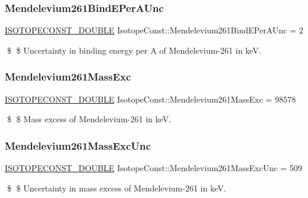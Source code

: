 \subsubsection{\texorpdfstring{Mendelevium261\+Bind\+E\+Per\+A\+Unc}{Mendelevium261BindEPerAUnc}}
{\footnotesize\ttfamily \mbox{\hyperlink{group___isotope_const-_macros_ga8f45a7272ce02c0b4c65c44636ed719a}{I\+S\+O\+T\+O\+P\+E\+C\+O\+N\+S\+T\+\_\+\+D\+O\+U\+B\+LE}} Isotope\+Const\+::\+Mendelevium261\+Bind\+E\+Per\+A\+Unc = 2}

\$ \$ Uncertainty in binding energy per A of Mendelevium-\/261 in keV. \mbox{\label{group___isotope_const-_mendelevium-_md261_ga8e60edaa6be277cbade5ac67ab75b1ed}} 
\subsubsection{\texorpdfstring{Mendelevium261\+Mass\+Exc}{Mendelevium261MassExc}}
{\footnotesize\ttfamily \mbox{\hyperlink{group___isotope_const-_macros_ga8f45a7272ce02c0b4c65c44636ed719a}{I\+S\+O\+T\+O\+P\+E\+C\+O\+N\+S\+T\+\_\+\+D\+O\+U\+B\+LE}} Isotope\+Const\+::\+Mendelevium261\+Mass\+Exc = 98578}

\$ \$ Mass excess of Mendelevium-\/261 in keV. \mbox{\label{group___isotope_const-_mendelevium-_md261_ga5534ceccb4458aea1d197ea616193dbe}} 
\subsubsection{\texorpdfstring{Mendelevium261\+Mass\+Exc\+Unc}{Mendelevium261MassExcUnc}}
{\footnotesize\ttfamily \mbox{\hyperlink{group___isotope_const-_macros_ga8f45a7272ce02c0b4c65c44636ed719a}{I\+S\+O\+T\+O\+P\+E\+C\+O\+N\+S\+T\+\_\+\+D\+O\+U\+B\+LE}} Isotope\+Const\+::\+Mendelevium261\+Mass\+Exc\+Unc = 509}

\$ \$ Uncertainty in mass excess of Mendelevium-\/261 in keV. \mbox{\label{group___isotope_const-_mendelevium-_md261_ga37c0b01fcfd3bd4475b7fd6e52dd2b35}} 
